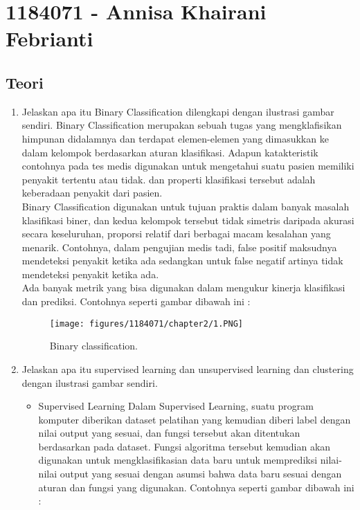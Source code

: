 \section{1184071 - Annisa Khairani Febrianti}
\subsection{Teori}
\begin{enumerate}

	\item Jelaskan apa itu Binary Classification dilengkapi dengan ilustrasi gambar sendiri.
	\hfill\break
Binary Classification merupakan sebuah tugas yang mengklafisikan himpunan didalamnya dan terdapat elemen-elemen yang dimasukkan ke dalam kelompok berdasarkan aturan klasifikasi. Adapun katakteristik contohnya pada tes medis digunakan untuk mengetahui suatu pasien memiliki penyakit tertentu atau tidak. dan properti klasifikasi tersebut adalah keberadaan penyakit dari pasien.\\
Binary Classification digunakan untuk tujuan praktis dalam banyak masalah klasifikasi biner, dan kedua kelompok tersebut tidak simetris daripada akurasi secara keseluruhan, proporsi relatif dari berbagai macam kesalahan yang menarik. Contohnya, dalam pengujian medis tadi, false positif maksudnya mendeteksi penyakit ketika ada sedangkan untuk false negatif artinya tidak mendeteksi penyakit ketika ada.\\
Ada banyak metrik yang bisa digunakan dalam mengukur kinerja klasifikasi dan prediksi. Contohnya seperti gambar dibawah ini :

	\begin{figure}[h]
	\centering
		\texttt{[image: figures/1184071/chapter2/1.PNG]}
		\caption{Binary classification.}
	\end{figure}

	\item Jelaskan apa itu supervised learning dan unsupervised learning dan clustering dengan ilustrasi gambar sendiri.
	\hfill\break

	\begin{itemize}
		\item Supervised Learning
		\hfill\break Dalam Supervised Learning, suatu program komputer diberikan dataset pelatihan yang kemudian diberi label dengan nilai output yang sesuai, dan fungsi tersebut akan ditentukan berdasarkan pada dataset. Fungsi algoritma tersebut kemudian akan digunakan untuk mengklasifikasian data baru untuk memprediksi nilai-nilai output yang sesuai dengan asumsi bahwa data baru sesuai dengan aturan dan fungsi yang digunakan. Contohnya seperti gambar dibawah ini :
		

\end{itemize}
\end{enumerate}
